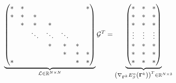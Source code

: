 \documentclass[../dissertation.tex]{subfiles}
\begin{document}
\begin{equation*}
    \underbrace{
    \begin{pmatrix}
        * & * &   &   &   & & * \\
        * & * & * &   &   & &  \\
          & * & * & * &  &  &   \\
          &   & \ddots  & \ddots & \ddots &  & \\
          &   &   & *  &  * & * & \\
          &  & &  & *  & *  & * \\
        * &   & &  &   & *  & *
    \end{pmatrix}
}_{\mathcal{L} \in \mathbb{R}^{N \times N}}
\mathcal{G}^T
=
\underbrace{
\begin{pmatrix}
    * & * & * \\
    * & * & * \\
    * & * & * \\
    \vdots & \vdots & \vdots \\
    * & * & * \\
    * & * & * \\
    * & * & *
\end{pmatrix}
}_{\left( \nabla_{\boldsymbol{\Gamma}^k} E_{\beta}^{\alpha} \left( \boldsymbol{\Gamma}^k \right) \right)^T \in \mathbb{R}^{N \times 3}}
\end{equation*}


\end{document}
